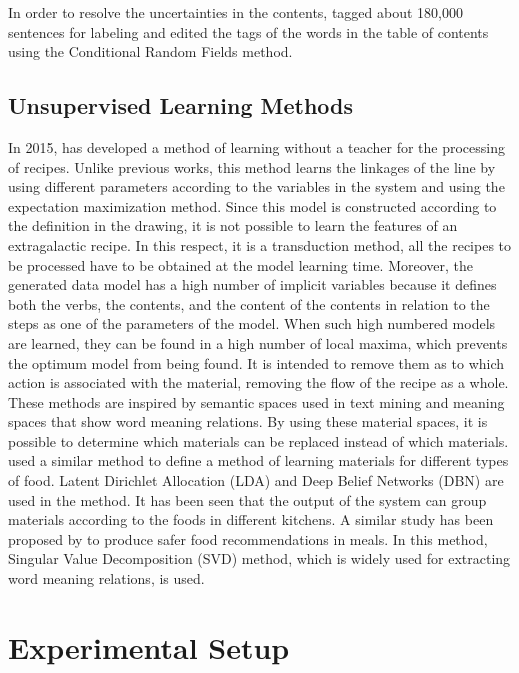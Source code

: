 In order to resolve the uncertainties in the contents, \cite{greene} tagged about 180,000 sentences for labeling and edited the tags of the words in the table of contents using the Conditional Random Fields method.

\subsection{Unsupervised Learning Methods}

In 2015, \cite{kiddon2015mise} has developed a method of learning without a teacher for the processing of recipes. Unlike previous works, this method learns the linkages of the line by using different parameters according to the variables in the system and using the expectation maximization method. Since this model is constructed according to the definition in the drawing, it is not possible to learn the features of an extragalactic recipe. In this respect, it is a transduction method, all the recipes to be processed have to be obtained at the model learning time. Moreover, the generated data model has a high number of implicit variables because it defines both the verbs, the contents, and the content of the contents in relation to the steps as one of the parameters of the model. When such high numbered models are learned, they can be found in a high number of local maxima, which prevents the optimum model from being found.
It is intended to remove them as to which action is associated with the material, removing the flow of the recipe as a whole. These methods are inspired by semantic spaces used in text mining and meaning spaces that show word meaning relations. By using these material spaces, it is possible to determine which materials can be replaced instead of which materials. \cite{nedovic2013learning} used a similar method to define a method of learning materials for different types of food. Latent Dirichlet Allocation (LDA) and Deep Belief Networks (DBN) are used in the method. It has been seen that the output of the system can group materials according to the foods in different kitchens. A similar study has been proposed by \cite{achananuparp2016extracting} to produce safer food recommendations in meals. In this method, Singular Value Decomposition (SVD) method, which is widely used for extracting word meaning relations, is used.

\section{Experimental Setup}

